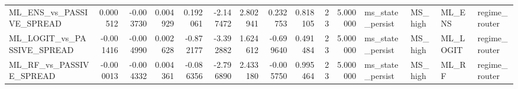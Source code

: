 \begin{table}
\begin{tabular}{lrrrrrrrrrrllll}
ML_ENS_vs_PASSIVE_SPREAD & 0.000512 & -0.003730 & 0.004929 & 0.192061 & -2.147472 & 2.802941 & 0.232753 & 0.818105 & 23 & 5.000000 & ms_state_persist & MS_high & ML_ENS & regime_router \\
ML_LOGIT_vs_PASSIVE_SPREAD & -0.001416 & -0.004990 & 0.002628 & -0.872177 & -3.392882 & 1.624612 & -0.699640 & 0.491484 & 23 & 5.000000 & ms_state_persist & MS_high & ML_LOGIT & regime_router \\
ML_RF_vs_PASSIVE_SPREAD & -0.000013 & -0.004332 & 0.004361 & -0.086356 & -2.796890 & 2.433180 & -0.005750 & 0.995464 & 23 & 5.000000 & ms_state_persist & MS_high & ML_RF & regime_router \\
\bottomrule
\end{tabular}
\end{table}

